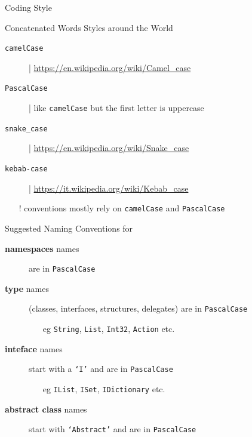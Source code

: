 \documentclass[presentation]{beamer}
\begin{document}
\begin{frame}{\csharp Coding Style}

    \begin{block}{Concatenated Words Styles around the World}
        \begin{description}
            \item[\texttt{camelCase}] | \url{https://en.wikipedia.org/wiki/Camel_case}
            \item[\texttt{PascalCase}] | like \texttt{camelCase} but the first letter is uppercase
            \item[\texttt{snake\_case}] |  \url{https://en.wikipedia.org/wiki/Snake_case}
            \item[\texttt{kebab-case}] |  \url{https://it.wikipedia.org/wiki/Kebab_case} 
        \end{description}
        \begin{itemize}
            \item[!] \dotnet conventions mostly rely on \texttt{camelCase} and \texttt{PascalCase}
        \end{itemize}
    \end{block}

    \begin{exampleblock}{Suggested Naming Conventions for \csharp}
        \begin{description}
            \item[\textbf{namespaces} names] are in \texttt{PascalCase} 

            \item[\textbf{type} names] (classes, interfaces, structures, delegates) are in \texttt{PascalCase}  
            \begin{itemize}
                \item[eg] \texttt{String}, \texttt{List}, \texttt{Int32}, \texttt{Action} etc.
            \end{itemize} 

            \item[\textbf{inteface} names] start with a \texttt{`I'} and are in \texttt{PascalCase} 
            \begin{itemize}
                \item[eg] \texttt{IList}, \texttt{ISet}, \texttt{IDictionary} etc.
            \end{itemize} 

            \item[\textbf{abstract class} names] start with \texttt{`Abstract'} and are in \texttt{PascalCase} 
            

\end{description}
\end{exampleblock}
\end{frame}
\end{document}

